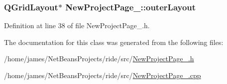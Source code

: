 \hypertarget{class_new_project_page__3_ade0fb5d0c05524c44f8b411150533757}{
\subsubsection[{outer\-Layout}]{\setlength{\rightskip}{0pt plus 5cm}Q\-Grid\-Layout$\ast$ New\-Project\-Page\-\_\-::outer\-Layout\hspace{0.3cm}{\ttfamily [private]}}}\label{class_new_project_page__3_ade0fb5d0c05524c44f8b411150533757}


Definition at line 38 of file New\-Project\-Page\-\_.\-h.



The documentation for this class was generated from the following files\-:\begin{DoxyCompactItemize}
\item 
/home/james/\-Net\-Beans\-Projects/ride/src/\hyperlink{_new_project_page__3_8h}{New\-Project\-Page\-\_.\-h}\item 
/home/james/\-Net\-Beans\-Projects/ride/src/\hyperlink{_new_project_page__3_8cpp}{New\-Project\-Page\-\_.\-cpp}\end{DoxyCompactItemize}
